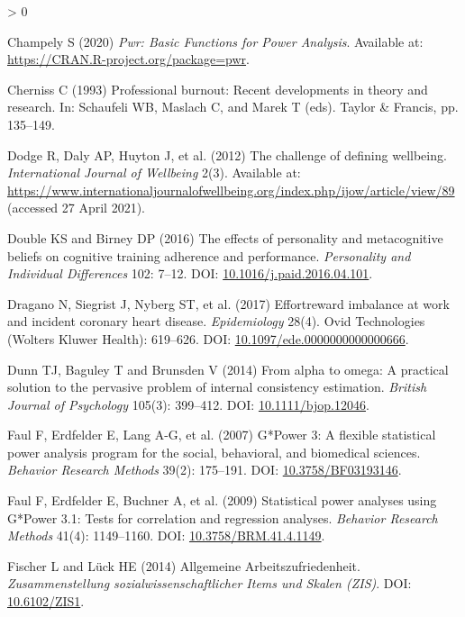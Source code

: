 \documentclass[
  english,
  man,floatsintext]{apa6}
\newlength{\cslhangindent}
\newenvironment{CSLReferences}[2] %
 {%
  \setlength{\parindent}{0pt}
  \ifodd #1 \everypar{\setlength{\hangindent}{\cslhangindent}}\ignorespaces\fi
  \ifnum #2 > 0
  \setlength{\parskip}{#2\baselineskip}
  \fi
 }%
 {}
\begin{document}
\begin{CSLReferences}{1}{0}
\leavevmode\hypertarget{ref-Champely2020}{}%
Champely S (2020) \emph{Pwr: Basic Functions for Power Analysis}. Available at: \url{https://CRAN.R-project.org/package=pwr}.

\leavevmode\hypertarget{ref-Cherniss1993}{}%
Cherniss C (1993) Professional burnout: Recent developments in theory and research. In: Schaufeli WB, Maslach C, and Marek T (eds). Taylor \& Francis, pp. 135--149.

\leavevmode\hypertarget{ref-Dodge2012}{}%
Dodge R, Daly AP, Huyton J, et al. (2012) The challenge of defining wellbeing. \emph{International Journal of Wellbeing} 2(3). Available at: \url{https://www.internationaljournalofwellbeing.org/index.php/ijow/article/view/89} (accessed 27 April 2021).

\leavevmode\hypertarget{ref-Double2016}{}%
Double KS and Birney DP (2016) The effects of personality and metacognitive beliefs on cognitive training adherence and performance. \emph{Personality and Individual Differences} 102: 7--12. DOI: \href{https://doi.org/10.1016/j.paid.2016.04.101}{10.1016/j.paid.2016.04.101}.

\leavevmode\hypertarget{ref-Dragano2017}{}%
Dragano N, Siegrist J, Nyberg ST, et al. (2017) Effort{{}}reward imbalance at work and incident coronary heart disease. \emph{Epidemiology} 28(4). Ovid Technologies (Wolters Kluwer Health): 619--626. DOI: \href{https://doi.org/10.1097/ede.0000000000000666}{10.1097/ede.0000000000000666}.

\leavevmode\hypertarget{ref-Dunn2014}{}%
Dunn TJ, Baguley T and Brunsden V (2014) From alpha to omega: {A} practical solution to the pervasive problem of internal consistency estimation. \emph{British Journal of Psychology} 105(3): 399--412. DOI: \href{https://doi.org/10.1111/bjop.12046}{10.1111/bjop.12046}.

\leavevmode\hypertarget{ref-Faul2007}{}%
Faul F, Erdfelder E, Lang A-G, et al. (2007) G*{Power} 3: {A} flexible statistical power analysis program for the social, behavioral, and biomedical sciences. \emph{Behavior Research Methods} 39(2): 175--191. DOI: \href{https://doi.org/10.3758/BF03193146}{10.3758/BF03193146}.

\leavevmode\hypertarget{ref-Faul2009}{}%
Faul F, Erdfelder E, Buchner A, et al. (2009) Statistical power analyses using {G}*{Power} 3.1: {Tests} for correlation and regression analyses. \emph{Behavior Research Methods} 41(4): 1149--1160. DOI: \href{https://doi.org/10.3758/BRM.41.4.1149}{10.3758/BRM.41.4.1149}.

\leavevmode\hypertarget{ref-Fischer2014}{}%
Fischer L and Lück HE (2014) Allgemeine {Arbeitszufriedenheit}. \emph{Zusammenstellung sozialwissenschaftlicher Items und Skalen (ZIS)}. DOI: \href{https://doi.org/10.6102/ZIS1}{10.6102/ZIS1}.


\end{CSLReferences}
\end{document}
